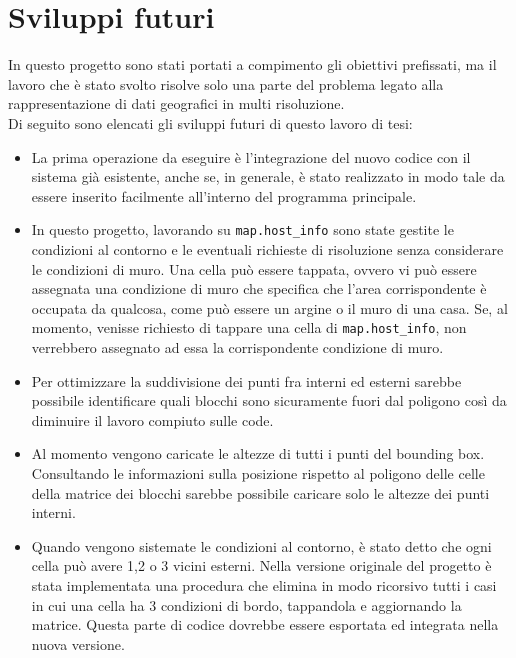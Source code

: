 	\section{Sviluppi futuri}
		In questo progetto sono stati portati a compimento gli obiettivi prefissati, ma il lavoro che \`{e} stato svolto risolve solo una parte del problema legato alla rappresentazione di dati geografici in multi risoluzione.\\
		Di seguito sono elencati gli sviluppi futuri di questo lavoro di tesi:
		\begin{itemize}
			\item La prima operazione da eseguire \`{e} l'integrazione del nuovo codice con il sistema gi\`{a} esistente, anche se, in generale, \`{e} stato realizzato in modo tale da essere inserito facilmente all'interno del programma principale.
			\item In questo progetto, lavorando su \texttt{map.host\_info} sono state gestite le condizioni al contorno e le eventuali richieste di risoluzione senza considerare le condizioni di muro. Una cella pu\`{o} essere tappata, ovvero vi pu\`{o} essere assegnata una condizione di muro che specifica che l'area corrispondente \`{e} occupata da qualcosa, come pu\`{o} essere un argine o il muro di una casa. Se, al momento, venisse richiesto di tappare una cella di \texttt{map.host\_info}, non verrebbero assegnato ad essa la corrispondente condizione di muro.
			\item Per ottimizzare la suddivisione dei punti fra interni ed esterni sarebbe possibile identificare quali blocchi sono sicuramente fuori dal poligono cos\`{i} da diminuire il lavoro compiuto sulle code.
			\item Al momento vengono caricate le altezze di tutti i punti del bounding box. Consultando le informazioni sulla posizione rispetto al poligono delle celle della matrice dei blocchi sarebbe possibile caricare solo le altezze dei punti interni.
			\item Quando vengono sistemate le condizioni al contorno, \`{e} stato detto che ogni cella pu\`{o} avere 1,2 o 3 vicini esterni. Nella versione originale del progetto \`{e} stata implementata una procedura che elimina in modo ricorsivo tutti i casi in cui una cella ha 3 condizioni di bordo, tappandola e aggiornando la matrice. Questa parte di codice dovrebbe essere esportata ed integrata nella nuova versione.
		\end{itemize} 